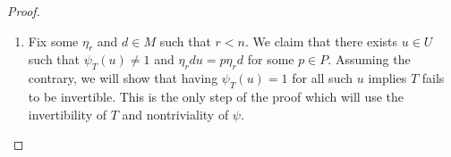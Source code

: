 \begin{proof}
\begin{enumerate}
		Suppose $u\in U$ satisfies $p\coloneqq\eta_ru\eta_r^{-1} \in P$; we want to show that $\chi(p)=1$. We can expand $u$ as
        \[u=\begin{bmatrix}
            1_{n-r} && A & B \\ & 1_r & C & D \\
				&& 1_{n-r} \\ &&& 1_r
        \end{bmatrix}\]
        and then compute
		\begin{align*}
			p &= \begin{bmatrix}
				1_{n-r} & \varepsilon B & A \\ & 1_r \\
				&& 1_{n-r} \\ & \varepsilon D & C & 1_r
			\end{bmatrix}.
		\end{align*}
		Then $p\in P$ is equivalent to $D=0$, in which case one can directly compute $\chi(p)=1$.

		\item Fix some $\eta_r$ and $d\in M$ such that $r<n$. We claim that there exists $u\in U$ such that $\psi_T(u)\ne1$ and $\eta_rdu=p\eta_rd$ for some $p\in P$. Assuming the contrary, we will show that having $\psi_T(u)=1$ for all such $u$ implies $T$ fails to be invertible. This is the only step of the proof which will use the invertibility of $T$ and nontriviality of $\psi$.


\end{enumerate}
\end{proof}
